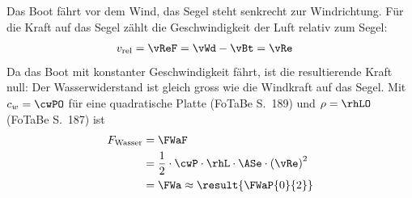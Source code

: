 Das Boot fährt vor dem Wind, das Segel steht senkrecht zur Windrichtung. Für die Kraft auf das Segel zählt die Geschwindigkeit der Luft relativ zum Segel:
\begin{align}
 v_\text{rel} &= \vReF = \vWd-\vBt = \vRe
\end{align}
Da das Boot mit konstanter Geschwindigkeit fährt, ist die resultierende Kraft null: Der Wasserwiderstand ist gleich gross wie die Windkraft auf das Segel. Mit $c_w = \cwPO$ für eine quadratische Platte (FoTaBe S.~189) und $\rho = \rhLO$ (FoTaBe S.~187) ist
\begin{align}
 F_\text{Wasser} &= \FWaF \\
   &= \frac{1}{2}\cdot\cwP\cdot\rhL\cdot\ASe\cdot\left(\vRe\right)^2 \\
   &= \FWa \approx \result{\FWaP{0}{2}}
\end{align}
